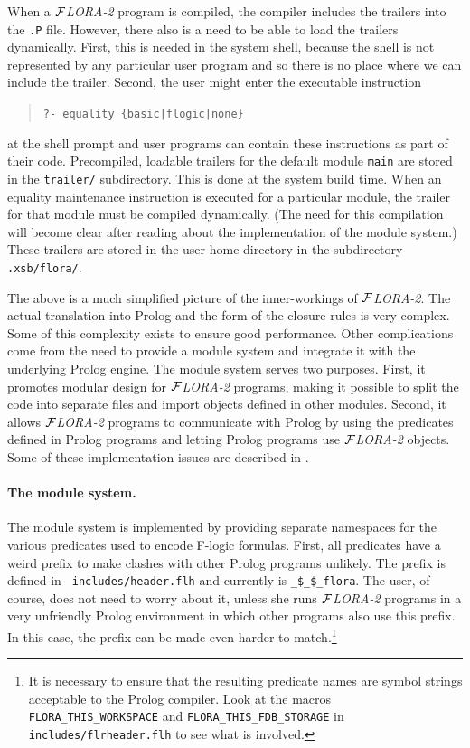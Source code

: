 \documentclass[11pt]{article}
\newcommand{\FLORA}{{\mbox{${\cal F}${\small\it LORA}\rm\emph{-2}}}\xspace}
\newcommand{\fl}{\mbox{F-logic}\xspace}
\begin{document}
When a \FLORA program is compiled, the compiler includes the trailers into
the {\tt .P} file. However, there also is a need to be able to load the
trailers dynamically. First, this is needed in the system shell, because
the shell is not represented by any particular user program and so there is
no place where we can include the trailer. Second, the user might enter the
executable instruction 
\begin{quote}
   {\tt ?- equality \{basic|flogic|none\} }
\end{quote}
at the shell prompt and user programs can contain these instructions as
part of their code. Precompiled, loadable trailers for the default module
{\tt main} are stored in the {\tt trailer/} subdirectory. This is done at
the system build time.  When an equality maintenance instruction is
executed for a particular module, the trailer for that module must be
compiled dynamically.  (The need for this compilation will become clear
after reading about the implementation of the module system.)  These
trailers are stored in the user home directory in the subdirectory {\tt
  .xsb/flora/}.

The above is a much simplified picture of the inner-workings of \FLORA. The
actual translation into Prolog and the form of the closure rules is very
complex.  Some of this complexity exists to ensure good performance.  Other
complications come from the need to provide a module system and integrate
it with the underlying Prolog engine.  The module system serves two
purposes.  First, it promotes modular design for \FLORA programs, making it
possible to split the code into separate files and import objects defined
in other modules. Second, it allows \FLORA programs to communicate with
Prolog by using the predicates defined in Prolog programs and letting
Prolog programs use \FLORA objects.  Some of these implementation issues
are described in \cite{guiz-flora-00}.

\paragraph{The module system.} The module system is implemented by
providing separate namespaces for the various predicates used to encode \fl
formulas. First, all predicates have a weird prefix to make clashes with
other Prolog programs unlikely. The prefix is defined in {\tt
  includes/header.flh} and currently is {\tt \_\$\_\$\_flora}. The user, of
course, does not need to worry about it, unless she runs \FLORA programs in
a very unfriendly Prolog environment in which other programs also use this
prefix. In this case, the prefix can be made
even harder to match.\footnote{
  It is necessary to ensure that the resulting predicate names are symbol
  strings acceptable to the Prolog compiler. Look at the macros
  {\tt FLORA\_THIS\_WORKSPACE} and {\tt FLORA\_THIS\_FDB\_STORAGE} in
  {\tt includes/flrheader.flh} to see what is involved.
  }
\end{document}
